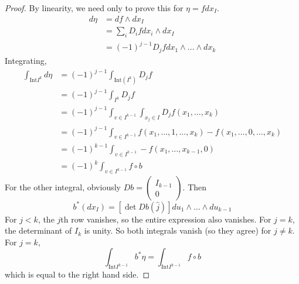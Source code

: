 \documentclass[12pt]{article}
\begin{document}
\begin{proof}
    By linearity, we need only to prove this for $\eta = fdx_I$.
    \begin{align*}
        d\eta &= df \wedge dx_I \\
              &= \sum_i D_ifdx_i \wedge dx_I \\
              &= (-1)^{j-1} D_jf dx_1 \wedge \dots \wedge dx_k
    \end{align*}
    Integrating,
    \begin{align*}
        \int_{\text{Int}I^k} d\eta &= (-1)^{j-1}\int_{\text{Int}(I^k)} D_jf \\
                                   &= (-1)^{j-1} \int_{I^k} D_jf \\
                                   &= (-1)^{j-1} \int_{v \in I^{k-1}} \int_{x_j \in I} D_j f(x_1,\dots,x_k) \\
                                   &= (-1)^{j-1} \int_{v \in I^{k-1}} f(x_1,\dots,1,\dots,x_k) - f(x_1,\dots,0,\dots,x_k) \\
                                   &= (-1)^{k-1} \int_{v \in I^{k-1}} - f(x_1,\dots,x_{k-1},0) \\
                                   &= (-1)^k \int_{v \in I^{k-1}} f \circ b
    \end{align*}
    For the other integral, obviously $Db = \begin{pmatrix} I_{k-1} \\ 0 \end{pmatrix}$. Then
    $$b^*(dx_I) = [\det Db(\hat j)]du_1 \wedge \dots \wedge du_{k-1}$$
    For $j < k$, the $j$th row vanishes, so the entire expression also vanishes. For $j = k$, the determinant of $I_k$ is unity. So both integrals vanish (so they agree) for $j \ne k$. For $j = k$,
    $$\int_{\text{Int}I^{k-1}} b^*\eta = \int_{\text{Int}I^{k-1}} f \circ b$$
    which is equal to the right hand side.
\end{proof}
\end{document}
